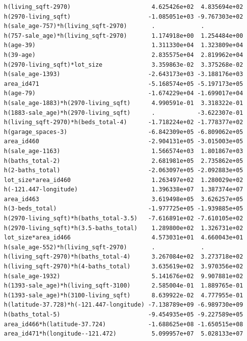 \documentclass[
]{article}
\begin{document}
\begin{verbatim}
h(living_sqft-2970)                       4.625426e+02  4.835694e+02
h(2970-living_sqft)                      -1.085051e+03 -9.767303e+02
h(sale_age-757)*h(living_sqft-2970)       .             .           
h(757-sale_age)*h(living_sqft-2970)       1.174918e+00  1.254484e+00
h(age-39)                                 1.311330e+04  1.323809e+04
h(39-age)                                 2.835575e+04  2.819962e+04
h(2970-living_sqft)*lot_size              3.359863e-02  3.375268e-02
h(sale_age-1393)                         -2.643173e+03 -3.188176e+03
area_id471                               -5.168574e+05 -5.197173e+05
h(age-79)                                -1.674229e+04 -1.699017e+04
h(sale_age-1883)*h(2970-living_sqft)      4.990591e-01  3.318322e-01
h(1883-sale_age)*h(2970-living_sqft)      .            -3.622307e-01
h(living_sqft-2970)*h(beds_total-4)      -1.718224e+02 -1.778377e+02
h(garage_spaces-3)                       -6.842309e+05 -6.809062e+05
area_id460                               -2.904131e+05 -3.015003e+05
h(sale_age-1163)                          1.566574e+03  1.801867e+03
h(baths_total-2)                          2.681981e+05  2.735862e+05
h(2-baths_total)                         -2.063097e+05 -2.092883e+05
lot_size*area_id460                       1.263497e+02  1.280029e+02
h(-121.447-longitude)                     1.396338e+07  1.387374e+07
area_id463                                3.619498e+05  3.626257e+05
h(3-beds_total)                          -1.977725e+05 -1.939885e+05
h(2970-living_sqft)*h(baths_total-3.5)   -7.616891e+02 -7.610105e+02
h(2970-living_sqft)*h(3.5-baths_total)    1.289800e+02  1.326731e+02
lot_size*area_id466                       4.573031e+01  4.660043e+01
h(sale_age-552)*h(living_sqft-2970)       .             .           
h(living_sqft-2970)*h(baths_total-4)      3.267084e+02  3.273718e+02
h(living_sqft-2970)*h(4-baths_total)      3.635619e+02  3.970356e+02
h(sale_age-1932)                          5.141676e+02  9.907881e+02
h(1393-sale_age)*h(living_sqft-3100)      2.585004e-01  1.889765e-01
h(1393-sale_age)*h(3100-living_sqft)      8.639922e-02  4.777955e-01
h(latitude-37.728)*h(-121.447-longitude) -7.138789e+09 -6.989730e+09
h(baths_total-5)                         -9.454935e+05 -9.227589e+05
area_id466*h(latitude-37.724)            -1.688625e+08 -1.650515e+08
area_id471*h(longitude--121.472)          5.099957e+07  5.028133e+07
                                                                    

\end{verbatim}
\end{document}
